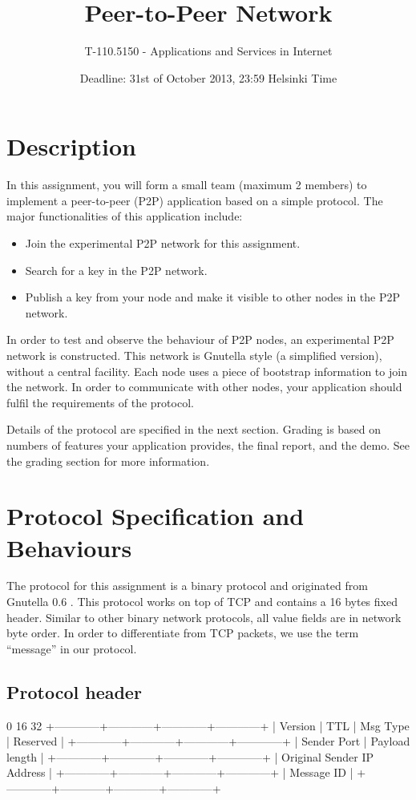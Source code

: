 \documentclass[12pt, a4paper]{article}
\title{Peer-to-Peer Network}
\author{T-110.5150 - Applications and Services in Internet}
\date{Deadline: 31st of October 2013, 23:59 Helsinki Time}
\begin{document}
\maketitle
\section{Description}
In this assignment, you will form a small team (maximum 2 members) to implement a peer-to-peer (P2P) application based on a simple protocol.
The major functionalities of this application include:

\begin{itemize}
\item Join the experimental P2P network for this assignment.
\item Search for a key in the P2P network.
\item Publish a key from your node and make it visible to other nodes in the P2P network.
\end{itemize}

In order to test and observe the behaviour of P2P nodes, an experimental P2P network is constructed.
This network is Gnutella style (a simplified version), without a central facility.
Each node uses a piece of bootstrap information to join the network.
In order to communicate with other nodes, your application should fulfil the requirements of the protocol.

Details of the protocol are specified in the next section.
Grading is based on numbers of features your application provides, the final report, and the demo.
See the grading section for more information.


\section{Protocol Specification and Behaviours}
The protocol for this assignment is a binary protocol and originated from Gnutella 0.6 \cite{gnutella}.
This protocol works on top of TCP and contains a 16 bytes fixed header.
Similar to other binary network protocols, all value fields are in network byte order.
In order to differentiate from TCP packets, we use the term ``message'' in our protocol.

\subsection{Protocol header}
\begin{verbbox}
0                          16                        32
+------------+------------+------------+------------+
|  Version   |     TTL    | Msg Type   |  Reserved  |
+------------+------------+------------+------------+
|       Sender Port       |       Payload length    |
+------------+------------+------------+------------+
|            Original Sender IP Address             |
+------------+------------+------------+------------+
|                     Message ID                    |
+------------+------------+------------+------------+
\end{verbbox}
\end{document}
